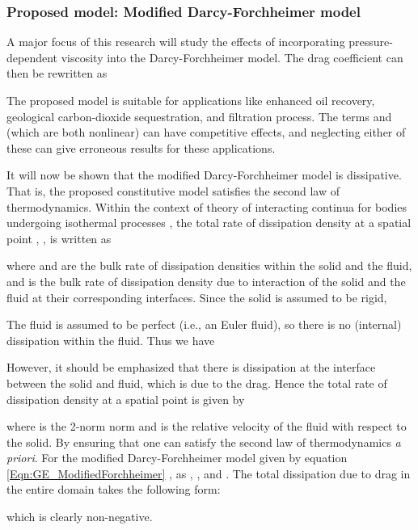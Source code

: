 \documentclass[11pt,reqno]{amsart}
\begin{document}
\subsubsection{Proposed model: Modified Darcy-Forchheimer model}
A major focus of this research will study the effects 
of incorporating pressure-dependent viscosity into 
the Darcy-Forchheimer model. The drag coefficient 
can then be rewritten as

The proposed model is suitable for applications like 
enhanced oil recovery, geological carbon-dioxide 
sequestration, and filtration process. The terms  
and  (which are both nonlinear) 
can have competitive effects, and neglecting either of 
these can give erroneous results for these applications. 

It will now be shown that the modified Darcy-Forchheimer 
model is dissipative. That is, the proposed constitutive 
model satisfies the second law of thermodynamics. Within 
the context of theory of interacting continua for bodies 
undergoing isothermal processes \cite{Bowen}, the total 
rate of dissipation density at a spatial point , , is written 
as

where  and  are the bulk rate of dissipation densities within the 
solid and the fluid, and  
is the bulk rate of dissipation density due to interaction of the 
solid and the fluid at their corresponding interfaces. 
Since the solid is assumed to be rigid,  

The fluid is assumed to be perfect (i.e., an Euler 
fluid), so there is no (internal) dissipation within 
the fluid. Thus we have 

However, it should be emphasized that there is 
dissipation at the interface between the solid 
and fluid, which is due to the drag. Hence the 
total rate of dissipation density at a spatial 
point  is given by 

where  is the 2-norm norm and  is the relative velocity of the fluid 
with respect to the solid. By ensuring that  one can satisfy the 
second law of thermodynamics \emph{a priori}. For the 
modified Darcy-Forchheimer model given by equation 
\eqref{Eqn:GE_ModifiedForchheimer} , as , ,  and .
The total dissipation due to drag in the entire domain 
takes the following form:

which is clearly non-negative. 
\end{document}
